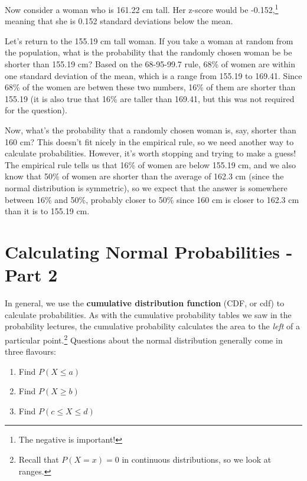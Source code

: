 \documentclass[
  letterpaper,
  DIV=11,
  numbers=noendperiod,
  oneside]{scrreprt}
\providecommand{\tightlist}{%
  \setlength{\itemsep}{0pt}\setlength{\parskip}{0pt}}\usepackage{longtable,booktabs,array}
\begin{document}
Now consider a woman who is 161.22 cm tall. Her z-score would be
-0.152,\footnote{The negative is important!} meaning that she is 0.152
standard deviations below the mean.

Let's return to the 155.19 cm tall woman. If you take a woman at random
from the population, what is the probability that the randomly chosen
woman be be shorter than 155.19 cm? Based on the 68-95-99.7 rule, 68\%
of women are within one standard deviation of the mean, which is a range
from 155.19 to 169.41. Since 68\% of the women are betwen these two
numbers, 16\% of them are shorter than 155.19 (it is also true that 16\%
are taller than 169.41, but this was not required for the question).

Now, what's the probability that a randomly chosen woman is, say,
shorter than 160 cm? This doesn't fit nicely in the empirical rule, so
we need another way to calculate probabilities. However, it's worth
stopping and trying to make a guess! The empirical rule tells us that
16\% of women are below 155.19 cm, and we also know that 50\% of women
are shorter than the average of 162.3 cm (since the normal distribution
is symmetric), so we expect that the answer is somewhere between 16\%
and 50\%, probably closer to 50\% since 160 cm is closer to 162.3 cm
than it is to 155.19 cm.

\hypertarget{calculating-normal-probabilities---part-2}{%
\section{Calculating Normal Probabilities - Part
2}\label{calculating-normal-probabilities---part-2}}

In general, we use the \textbf{cumulative distribution function} (CDF,
or cdf) to calculate probabilities. As with the cumulative probability
tables we saw in the probability lectures, the cumulative probability
calculates the area to the \emph{left} of a particular point.\footnote{Recall
  that \(P(X=x) = 0\) in continuous distributions, so we look at ranges.}
Questions about the normal distribution generally come in three
flavours:

\begin{enumerate}
\def\labelenumi{\arabic{enumi}.}
\tightlist
\item
  Find \(P(X \le a)\)
\item
  Find \(P(X \ge b)\)
\item
  Find \(P(c \le X\le d)\)
\end{enumerate}
\end{document}
